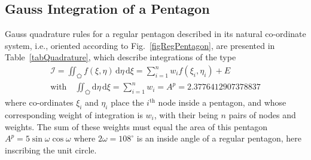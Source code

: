 \subsection{Gauss Integration of a Pentagon}
\label{sec:pentagonQuadrature}

Gauss quadrature rules for a regular pentagon described in its natural co-ordinate system, i.e., oriented according to Fig.~\ref{figRegPentagon}, are presented in Table~\ref{tabQuadrature}, which describe integrations of the type
\begin{multline}
    \mathcal{I} = \iint_{\pentagon} f ( \xi , \eta) \, \mathrm{d} \eta \, \mathrm{d} \xi = 
    \sum_{i=1}^n w_i f ( \xi_i , \eta_i ) + E \\
    \text{with} \quad
    \iint_{\pentagon} \mathrm{d} \eta \, \mathrm{d} \xi = \sum_{i=1}^n w_i =
    A^p = 2.3776412907378837 
\end{multline}
where co-ordinates $\xi_i$ and $\eta_i$ place the $i^{\text{th}}$ node inside a pentagon, and whose corresponding weight of integration is $w_i$, with their being $n$ pairs of nodes and weights.  The sum of these weights must equal the area of this pentagon $A^p = 5 \sin \omega \cos \omega$ where $2 \omega = 108^{\circ}$ is an inside angle of a regular pentagon, here inscribing the unit circle. 

